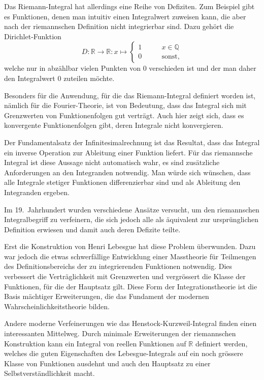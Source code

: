 Das Riemann-Integral hat allerdings eine Reihe von Defiziten.
Zum Beispiel gibt es Funktionen, denen man intuitiv einen Integralwert
zuweisen kann, die aber nach der riemannschen Definition nicht integrierbar
sind.
Dazu gehört die Dirichlet-Funktion
%
\[
D
\colon
\mathbb{R}\to\mathbb{R}
:
x\mapsto\begin{cases}
1&\qquad x\in\mathbb{Q}\\
0&\qquad \text{sonst,}
\end{cases}
\]
welche nur in abzählbar vielen Punkten von 0 verschieden ist und der
man daher den Integralwert $0$ zuteilen möchte.

Besonders für die Anwendung, für die das Riemann-Integral definiert worden
ist, nämlich für die Fourier-Theorie, ist von Bedeutung, dass das
Integral sich mit Grenzwerten von Funktionenfolgen gut verträgt.
Auch hier zeigt sich, dass es konvergente Funktionenfolgen gibt, deren
Integrale nicht konvergieren.

Der Fundamentalsatz der Infinitesimalrechnung ist das Resultat,
dass das Integral ein inverse Operation zur Ableitung einer
Funktion liefert.
Für das riemannsche Integral ist diese Aussage nicht automatisch
wahr, es sind zusätzliche Anforderungen an den Integranden notwendig.
Man würde sich wünschen, dass alle Integrale stetiger Funktionen
differenzierbar sind und als Ableitung den Integranden ergeben.

Im 19.~Jahrhundert wurden verschiedene Ansätze versucht, um den 
riemannschen Integralbegriff zu verfeinern, die sich jedoch alle als
äquivalent zur ursprünglichen Definition erwiesen und damit auch
deren Defizite teilte.

Erst die Konstruktion von Henri Lebesgue hat diese Problem überwunden.
%
Dazu war jedoch die etwas schwerfällige Entwicklung einer Masstheorie
%
für Teilmengen des Definitionsbereichs der zu integrierenden Funktionen
notwendig.
Dies verbessert die Verträglichkeit mit Grenzwerten und vergrössert
die Klasse der Funktionen, für die der Hauptsatz gilt.
Diese Form der Integrationstheorie ist die Basis mächtiger Erweiterungen,
die das Fundament der modernen Wahrscheinlichkeitstheorie bilden.

Andere moderne Verfeinerungen wie das Henstock-Kurzweil-Integral
finden einen interessanten Mittelweg.
Durch minimale Erweiterungen der riemannschen Konstruktion kann ein
Integral von reellen Funktionen auf $\mathbb{R}$ definiert werden,
%
welches die guten Eigenschaften des Lebesgue-Integrals auf ein noch
grössere Klasse von Funktionen ausdehnt und auch den Hauptsatz zu
einer Selbstverständlichkeit macht.

